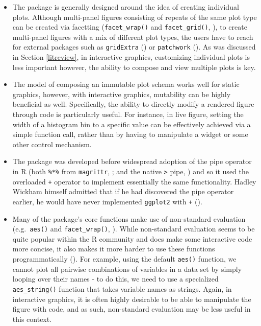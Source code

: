 \documentclass[
]{book}
\providecommand{\tightlist}{%
  \setlength{\itemsep}{0pt}\setlength{\parskip}{0pt}}
\theoremstyle{definition}
\theoremstyle{definition}
\theoremstyle{definition}
\theoremstyle{definition}
\theoremstyle{remark}
\begin{document}
\begin{itemize}
\tightlist
\item
  The package is generally designed around the idea of creating individual plots. Although multi-panel figures consisting of repeats of the same plot type can be created via facetting (\texttt{facet\_wrap()} and \texttt{facet\_grid()}, ), to create multi-panel figures with a mix of different plot types, the users have to reach for external packages such as \texttt{gridExtra} () or \texttt{patchwork} (). As was discussed in Section \ref{litreview}, in interactive graphics, customizing individual plots is less important however, the ability to compose and view multiple plots is key.
\item
  The model of composing an immutable plot schema works well for static graphics, however, with interactive graphics, mutability can be highly beneficial as well. Specifically, the ability to directly modify a rendered figure through code is particularly useful. For instance, in live figure, setting the width of a histogram bin to a specific value can be effectively achieved via a simple function call, rather than by having to manipulate a widget or some other control mechanism.\\
\item
  The package was developed before widespread adoption of the pipe operator in R (both \texttt{\%*\%} from \texttt{magrittr}, ; and the native \texttt{\textbar{}\textgreater{}} pipe, ) and so it used the overloaded \texttt{+} operator to implement essentially the same functionality. Hadley Wickham himself admitted that if he had discovered the pipe operator earlier, he would have never implemented \texttt{ggplot2} with \texttt{+} ().
\item
  Many of the package's core functions make use of non-standard evaluation (e.g.~\texttt{aes()} and \texttt{facet\_wrap()}, ). While non-standard evaluation seems to be quite popular within the R community and does make some interactive code more concise, it also makes it more harder to use these functions programmatically (). For example, using the default \texttt{aes()} function, we cannot plot all pairwise combinations of variables in a data set by simply looping over their names - to do this, we need to use a specialized \texttt{aes\_string()} function that takes variable names as strings. Again, in interactive graphics, it is often highly desirable to be able to manipulate the figure with code, and as such, non-standard evaluation may be less useful in this context.
\end{itemize}
\end{document}

